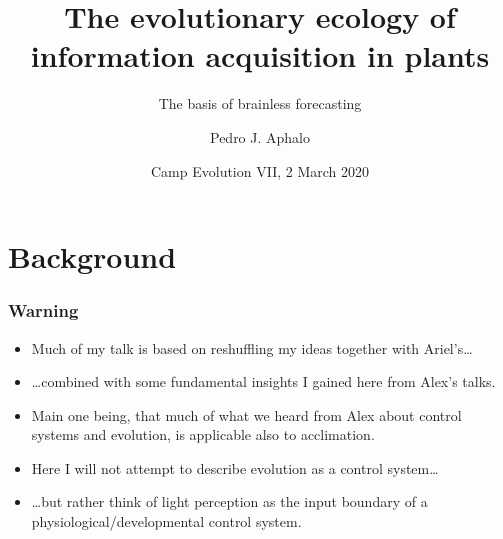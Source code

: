 \documentclass[11pt]{beamer}\usepackage[]{graphicx}\usepackage[]{xcolor}
\begin{document}

\title{The evolutionary ecology of information acquisition in plants}
\subtitle{The basis of brainless forecasting}
\author{Pedro J. Aphalo}
\date{Camp Evolution VII, 2 March 2020}


	\begin{frame}
		\maketitle
	\end{frame}



\section{Background}

\begin{frame}
\frametitle{Warning}
\begin{itemize}
  \item Much of my talk is based on reshuffling my ideas together with Ariel's\ldots
  \item \ldots combined with some fundamental insights I gained here from Alex's talks.
  \item Main one being, that much of what we heard from Alex about control systems and evolution, is applicable also to acclimation.
  \item Here I will not attempt to describe evolution as a control system\ldots
  \item \ldots but rather think of light perception as the input boundary of a physiological/developmental control system.
\end{itemize}
\end{frame}
\end{document}
